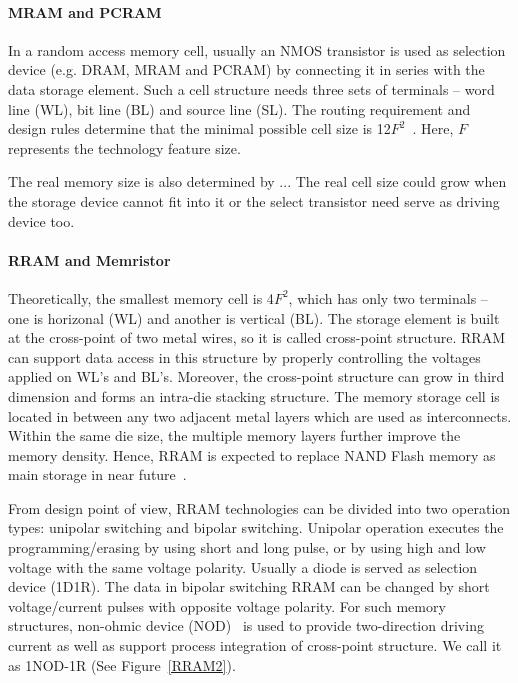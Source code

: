 \paragraph{MRAM and PCRAM}

In a random access memory cell, usually an NMOS transistor is used as selection device (e.g. DRAM, MRAM and PCRAM) by connecting it in series with the data storage element. Such a cell structure needs three sets of terminals -- word line (WL), bit line (BL) and source line (SL). The routing requirement and design rules determine that the minimal possible cell size is 12$F^2$~\cite{Li09}. Here, $F$ represents the technology feature size.

The real memory size is also determined by ...
The real cell size could grow when the storage device cannot fit into it or the select transistor need serve as driving device too.



\paragraph{RRAM and Memristor}

Theoretically, the smallest memory cell is 4$F^2$, which has only two terminals -- one is horizonal (WL) and another is vertical (BL). The storage element is built at the cross-point of two metal wires, so it is called cross-point structure. RRAM can support data access in this structure by properly controlling the voltages applied on WL's and BL's. Moreover, the cross-point structure can grow in third dimension and forms an intra-die stacking structure. The memory storage cell is located in between any two adjacent metal layers which are used as interconnects. Within the same die size, the multiple memory layers further improve the memory density. Hence, RRAM is expected to replace NAND Flash memory as main storage in near future~\cite{ITRS07}.

From design point of view, RRAM technologies can be divided into two operation types: unipolar switching and bipolar switching. Unipolar operation executes the programming/erasing by using short and long pulse, or by using high and low voltage with the same voltage polarity. Usually a diode is served as selection device (1D1R). The data in bipolar switching RRAM can be changed by short voltage/current pulses with opposite voltage polarity. For such memory structures, non-ohmic device (NOD)~\cite{Yan4430255} is used to provide two-direction driving current as well as support process integration of cross-point structure. We call it as 1NOD-1R (See Figure~\ref{RRAM2}).


